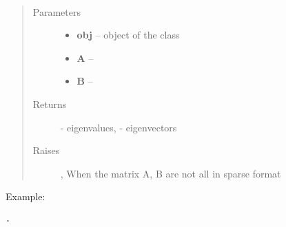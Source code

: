 \documentclass[letterpaper,10pt,english]{sphinxmanual}
\begin{document}
\begin{fulllineitems}
\label{index:brake.solve.solver.gev_sparse}~\begin{quote}\begin{description}
\item[{Parameters}] \leavevmode\begin{itemize}
\item {} 
\textbf{obj} -- object of the class 

\item {} 
\textbf{A} -- 

\item {} 
\textbf{B} -- 

\end{itemize}

\item[{Returns}] \leavevmode
{} - eigenvalues,  - eigenvectors

\item[{Raises }] \leavevmode
{}, When the matrix A, B are not all in sparse format

\end{description}\end{quote}

Example:

\begin{Verbatim}[commandchars=\\\{\}]
.
\end{Verbatim}

\end{fulllineitems}

\end{document}
